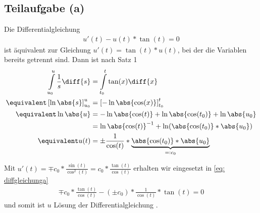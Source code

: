 \begin{exercisePage}
	\newcommand{\teilaufgabe}[1]{\section{Teilaufgabe (#1)}}
	\teilaufgabe{a}
	Die Differentialgleichung
	\begin{align} \label{eq: diffgleichunga}
	u'(t) - u(t) * \tan(t) = 0
	\end{align}
	ist äquivalent zur Gleichung $u'(t) = \tan(t) * u(t)$, bei der die Variablen bereits getrennt sind. Dann ist nach Satz 1
	\begin{align*}
	\int \limits_{u_0}^u{\frac{1}{s} \diff{s}} &= \int \limits_{t_0}^t{\tan(x) \diff{x}} \\
	\equivalent \left[ \ln \abs{s} \right]_{u_0}^u &= \left[ - \ln\abs{\cos(x)} \right]_{t_0}^t \\
	\equivalent  \ln\abs{u} &=  - \ln\abs{\cos(t)} + \ln\abs{\cos(t_0)} + \ln\abs{u_0} \\
	&= \ln\abs{\cos(t)}^{-1} + \ln(\abs{\cos(t_0)} *\abs{u_0}) \\
	\equivalent u(t) &= \pm \frac{1}{\cos(t)} * \underbrace{\abs{\cos(t_0)} *\abs{u_0}}_{=: c_0}
	\end{align*}
	
	Mit $u'(t) = \mp c_0 * \frac{\sin(t)}{\cos^2(t)} = c_0 * \frac{\tan(t)}{\cos(t)}$ erhalten wir eingesetzt in \cref{eq: diffgleichunga}
	\begin{align*}
	\mp c_0 * \frac{\tan(t)}{\cos(t)} - (\pm c_0) * \frac{1}{\cos(t)}  * \tan(t) = 0
	\end{align*}
	und somit ist $u$ Lösung der Differentialgleichung .
	

\end{exercisePage}
